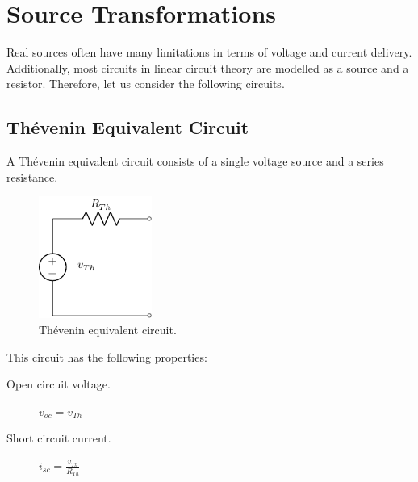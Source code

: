 \documentclass{article}
\begin{document}
\section{Source Transformations}
Real sources often have many limitations in terms of voltage and
current delivery. Additionally, most circuits in linear circuit theory
are modelled as a source and a resistor. Therefore, let us consider the
following circuits.
\subsection{Thévenin Equivalent Circuit}
\begin{definition}
    A Thévenin equivalent circuit consists of a single voltage source
    and a series resistance.
    \begin{figure}[H]
        \centering
        \includegraphics[height = 4cm, keepaspectratio = true]{figures/thevenin_equivalent.pdf}
        \caption{Thévenin equivalent circuit.}
    \end{figure}
    This circuit has the following properties:
    \begin{description}
        \item[Open circuit voltage.] \(v_{oc} = v_{Th}\)
        \item[Short circuit current.] \(i_{sc} =
              \frac{v_{Th}}{R_{Th}}\)
    \end{description}
\end{definition}
\end{document}
